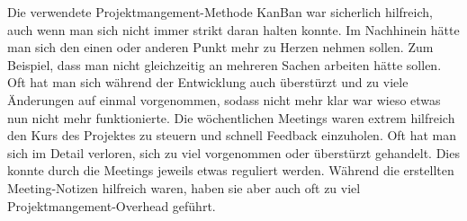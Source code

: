 Die verwendete Projektmangement-Methode KanBan war sicherlich hilfreich,
auch wenn man sich nicht immer strikt daran halten konnte.
Im Nachhinein hätte man sich den einen oder anderen Punkt mehr zu Herzen nehmen sollen.
Zum Beispiel, dass man nicht gleichzeitig an mehreren Sachen arbeiten hätte sollen.
Oft hat man sich während der Entwicklung auch überstürzt und zu viele Änderungen auf einmal vorgenommen, sodass nicht mehr klar war wieso etwas nun nicht mehr funktionierte.
Die wöchentlichen Meetings waren extrem hilfreich den Kurs des Projektes zu steuern und schnell Feedback einzuholen.
Oft hat man sich im Detail verloren, sich zu viel vorgenommen oder überstürzt gehandelt.
Dies konnte durch die Meetings jeweils etwas reguliert werden.
Während die erstellten Meeting-Notizen hilfreich waren, haben sie aber auch oft zu viel Projektmangement-Overhead geführt.

